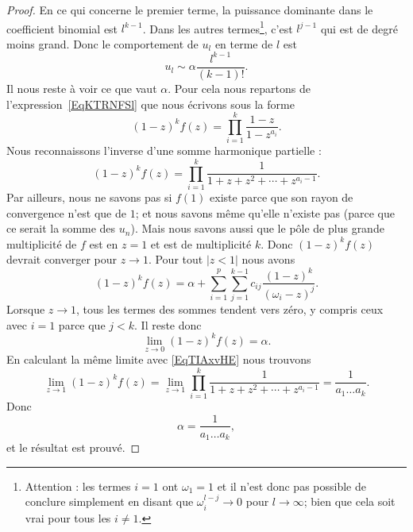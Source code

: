 \begin{proof}
    En ce qui concerne le premier terme, la puissance dominante dans le coefficient binomial est \( l^{k-1}\). Dans les autres termes\footnote{Attention : les termes \( i=1\) ont \( \omega_1=1\) et il n'est donc pas possible de conclure simplement en disant que \( \omega_i^{l-j}\to 0\) pour \( l\to \infty\); bien que cela soit vrai pour tous les \( i\neq 1\).}, c'est \( l^{j-1}\) qui est de degré moins grand. Donc le comportement de \( u_l\) en terme de \( l\) est
    \begin{equation}
        u_l\sim \alpha\frac{ l^{k-1} }{ (k-1)! }.
    \end{equation}
    Il nous reste à voir ce que vaut \( \alpha\). Pour cela nous repartons de l'expression~\ref{EqKTRNFSl} que nous écrivons sous la forme
    \begin{equation}
        (1-z)^kf(z)=\prod_{i=1}^{k}\frac{ 1-z }{ 1-z^{a_i} }.
    \end{equation}
    Nous reconnaissons l'inverse d'une somme harmonique partielle :
    \begin{equation}    \label{EqTIAxvHE}
        (1-z)^kf(z)=\prod_{i=1}^k\frac{1}{ 1+z+z^2+\cdots +z^{a_i-1} }.
    \end{equation}
    Par ailleurs, nous ne savons pas si \( f(1)\) existe parce que son rayon de convergence n'est que de \( 1\); et nous savons même qu'elle n'existe pas (parce que ce serait la somme des \( u_n\)). Mais nous savons aussi que le pôle de plus grande multiplicité de \( f\) est en \( z=1\) et est de multiplicité \( k\). Donc \( (1-z)^kf(z)\) devrait converger pour \( z\to 1\). Pour tout \( | z<1 |\) nous avons
    \begin{equation}
        (1-z)^kf(z)=\alpha+\sum_{i=1}^p\sum_{j=1}^{k-1}c_{ij}\frac{ (1-z)^k }{ (\omega_i-z)^j }.
    \end{equation}
    Lorsque \( z\to 1\), tous les termes des sommes tendent vers zéro, y compris ceux avec \( i=1\) parce que \( j<k\). Il reste donc
    \begin{equation}
        \lim_{z\to 0} (1-z)^kf(z)=\alpha.
    \end{equation}
    En calculant la même limite avec \eqref{EqTIAxvHE} nous trouvons
    \begin{equation}
        \lim_{z\to 1}(1-z)^kf(z)=\lim_{z\to 1}\prod_{i=1}^k\frac{1}{ 1+z+z^2+\cdots +z^{a_i-1} }=\frac{1}{ a_1\ldots a_k }.
    \end{equation}
    Donc
    \begin{equation}
        \alpha=\frac{1}{ a_1\ldots a_k },
    \end{equation}
    et le résultat est prouvé.

\end{proof}

